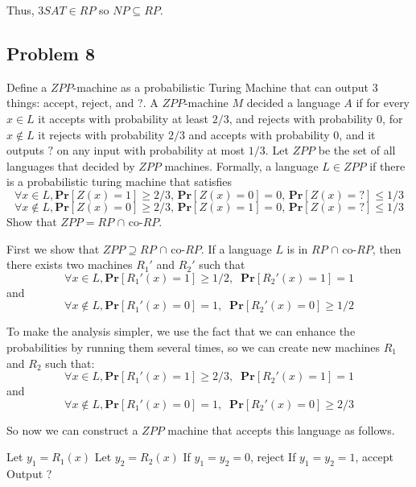 \documentclass[english]{article}
\begin{document}
Thus, $3SAT \in RP$ so $NP \subseteq RP$.

\subsection*{Problem 8}
Define a $ZPP$-machine as a probabilistic Turing Machine that can output 3 things: accept, reject, and ?.
A $ZPP$-machine $M$ decided a language $A$ if for every $x \in L$ it accepts with probability at least $2/3$, and
rejects with probability 0, for $x \notin L$ it rejects with probability $2/3$ and accepts with probability 0, and it
outputs $?$ on any input with probability at most $1/3$. Let $ZPP$ be the set of all languages that decided by
$ZPP$ machines. Formally, a language $L \in ZPP$ if there is a probabilistic turing machine that satisfies
\[\forall x \in L, \mathbf{Pr}[Z(x) = 1] \ge 2/3,\,\mathbf{Pr}[Z(x) = 0] = 0,\,\mathbf{Pr}[Z(x) = ?] \le 1/3 \]
\[\forall x \notin L, \mathbf{Pr}[Z(x) = 0] \ge 2/3,\,\mathbf{Pr}[Z(x) = 1] = 0,\,\mathbf{Pr}[Z(x) = ?] \le 1/3\]
Show that $ZPP = RP$ $\cap$ co-$RP$.

First we show that $ZPP \supseteq RP$ $\cap$ co-$RP$. 
If a language $L$ is in $RP$ $\cap$ co-$RP$, then there exists two machines $R_1'$ and $R_2'$ such that
\[\forall x \in L, \mathbf{Pr}[R_1'(x) = 1] \ge 1/2, \;\; \mathbf{Pr}[R_2'(x) = 1] = 1\]
and
\[\forall x \notin L, \mathbf{Pr}[R_1'(x) = 0] = 1, \;\; \mathbf{Pr}[R_2'(x) = 0] \ge 1/2\]

To make the analysis simpler, we use the fact that we can enhance the probabilities by running them several times,
so we can create new machines $R_1$ and $R_2$ such that:
\[\forall x \in L, \mathbf{Pr}[R_1'(x) = 1] \ge 2/3, \;\; \mathbf{Pr}[R_2'(x) = 1] = 1\]
and
\[\forall x \notin L, \mathbf{Pr}[R_1'(x) = 0] = 1, \;\; \mathbf{Pr}[R_2'(x) = 0] \ge 2/3\]

So now we can construct a $ZPP$ machine that accepts this language as follows. 
\begin{algorithmic}
  \State Let $y_1 = R_1(x)$
  \State Let $y_2 = R_2(x)$
  \State If $y_1 = y_2 = 0$, reject
  \State If $y_1 = y_2 = 1$, accept
  \State Output ?
\EndFunction 
\end{algorithmic}
\end{document}
